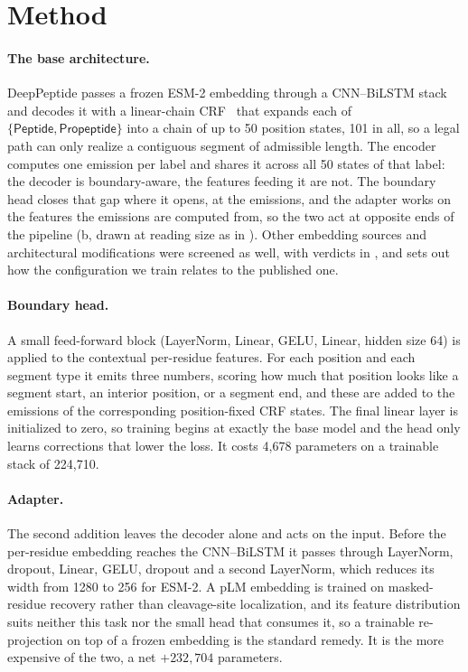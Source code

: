 \documentclass{article}
\begin{document}
\section{Method}
\label{sec:method}

\paragraph{The base architecture.} DeepPeptide passes a frozen ESM-2 embedding through a CNN--BiLSTM stack and decodes it with a linear-chain CRF~\citep{lafferty2001crf} that expands each of $\{\textsf{Peptide}, \textsf{Propeptide}\}$ into a chain of up to 50 position states, 101 in all, so a legal path can only realize a contiguous segment of admissible length. The encoder computes one emission per label and shares it across all 50 states of that label: the decoder is boundary-aware, the features feeding it are not. The boundary head closes that gap where it opens, at the emissions, and the adapter works on the features the emissions are computed from, so the two act at opposite ends of the pipeline (b, drawn at reading size as  in ). Other embedding sources and architectural modifications were screened as well, with verdicts in , and  sets out how the configuration we train relates to the published one.


\paragraph{Boundary head.} A small feed-forward block (LayerNorm, Linear, GELU, Linear, hidden size 64) is applied to the contextual per-residue features. For each position and each segment type it emits three numbers, scoring how much that position looks like a segment start, an interior position, or a segment end, and these are added to the emissions of the corresponding position-fixed CRF states. The final linear layer is initialized to zero, so training begins at exactly the base model and the head only learns corrections that lower the loss. It costs 4{,}678 parameters on a trainable stack of 224{,}710.

\paragraph{Adapter.} The second addition leaves the decoder alone and acts on the input. Before the per-residue embedding reaches the CNN--BiLSTM it passes through LayerNorm, dropout, Linear, GELU, dropout and a second LayerNorm, which reduces its width from 1280 to 256 for ESM-2. A pLM embedding is trained on masked-residue recovery rather than cleavage-site localization, and its feature distribution suits neither this task nor the small head that consumes it, so a trainable re-projection on top of a frozen embedding is the standard remedy. It is the more expensive of the two, a net $+232{,}704$ parameters.
\end{document}
